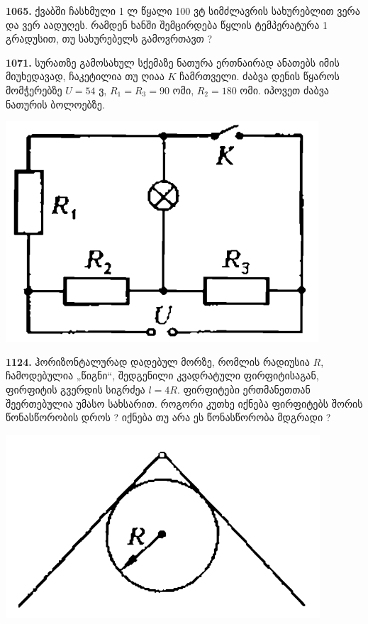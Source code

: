\documentclass[12pt,a4paper,]{report}
\begin{document}
\textbf{1065.} ქვაბში ჩასხმული 1 ლ წყალი 100 ვტ სიმძლავრის სახურებლით ვერა და ვერ აადუღეს. რამდენ ხანში შემცირდება წყლის ტემპერატურა 1 გრადუსით, თუ სახურებელს გამოვრთავთ ?

\textbf{1071.} სურათზე გამოსახულ სქემაზე ნათურა ერთნაირად ანათებს იმის მიუხედავად, ჩაკეტილია თუ ღიაა $K$ ჩამრთველი. ძაბვა დენის წყაროს მომჭერებზე $U=54$ ვ, $R_1=R_3=90$ ომი, $R_2=180$ ომი. იპოვეთ ძაბვა ნათურის ბოლოებზე.
		\begin{center}
			\includegraphics[scale=0.3]{images/F1071.png}
		\end{center}
	
\textbf{1124.} ჰორიზონტალურად დადებულ მორზე, რომლის რადიუსია $R$, ჩამოდებულია „წიგნი“, შედგენილი კვადრატული ფირფიტისაგან, ფირფიტის გვერდის სიგრძეა $l=4R$. ფირფიტები ერთმანეთთან შეერთებულია უმასო სახსარით. როგორი კუთხე იქნება ფირფიტებს შორის წონასწორობის დროს ? იქნება თუ არა ეს წონასწორობა მდგრადი ?
		\begin{center}
			\includegraphics[scale=0.2]{images/F1124.png}
		\end{center}
\end{document}

